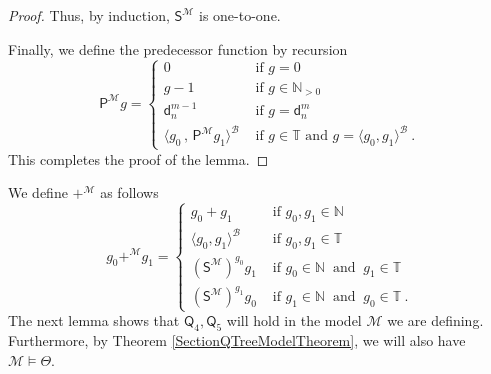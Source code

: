 \documentclass[10pt,a4paper, openany,  oldfontcommands]{memoir}
\newtheorem{open problem} [theorem] {Open Problem}
\newtheorem{open question} [theorem] {Open Question}
\renewcommand{\mathrm}{\mathsf}
\begin{document}
\begin{proof}
Thus, by induction,  $   \mathrm{S}^{  \mathcal{M}  }   $  is one-to-one. 






Finally, we define the predecessor function by recursion  
\[
\mathrm{P}^{  \mathcal{M}  }   g   =   \begin{cases}
0        &    \mbox{  if  } g = 0 
\\
g -1         &   \mbox{  if  }     g    \in  \mathbb{N}_{ > 0 } 
\\
\mathsf{d}^{ m- 1}_n        &   \mbox{  if  }     g  =  \mathsf{d}^m_n 
\\
\langle  g_0  \,  ,   \,    \mathrm{P}^{  \mathcal{M}  }   g_1   \rangle^{  \mathcal{B}    }         
                              &   \mbox{  if  }    g  \in  \mathbb{T}      \mbox{  and  }     g  =  \langle  g_0,  g_1  \rangle^{  \mathcal{B}   }
\         .
\end{cases}
\]
This completes the proof of the lemma.
\end{proof}










We define $  +^{  \mathcal{M} }  $   as follows 
\[
g_0 +^{  \mathcal{M}  }   g_1   =   \begin{cases}
g_0 +  g_1          &     \mbox{  if  }    g_0,  g_1   \in  \mathbb{N} 
\\
\langle  g_0,  g_1  \rangle^{  \mathcal{B}  }      &     \mbox{  if   }  g_0,  g_1   \in   \mathbb{T} 
\\
  \left(    \mathrm{S}^{  \mathcal{M}  }  \right)^{ g_0 }   g_1                     
               & \mbox{  if  }     g_0  \in  \mathbb{N}       \    \mbox{  and    }    \   g_1  \in  \mathbb{T}    
\\
  \left(    \mathrm{S}^{  \mathcal{M}  }  \right)^{ g_1 }   g_0          
                     & \mbox{  if  }     g_1  \in  \mathbb{N}      \    \mbox{  and    }    \          g_0  \in  \mathbb{T}    
\         .
\end{cases}
\]
The next lemma shows that   $  \mathsf{Q}_4,  \mathsf{Q}_5  $  will hold in   the model $  \mathcal{M} $ we are defining. 
Furthermore, by Theorem  \ref{SectionQTreeModelTheorem}, we will also have  $  \mathcal{M}  \models  \Theta   $. 
\end{document}
